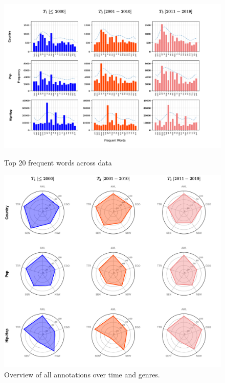 \documentclass[11pt,a4paper]{article}
\begin{document}
\begin{figure}[ht]
\centering
\includegraphics[width=\textwidth]{freqbarExtend}
\caption{Top 20 frequent words across data}
\label{fig:freqbarExtend}
\vspace*{\floatsep}%
\centering
\includegraphics[width=\textwidth]{spider}
\caption{Overview of all annotations over time and genres.}
\label{fig:spider}
\end{figure}
\end{document}
